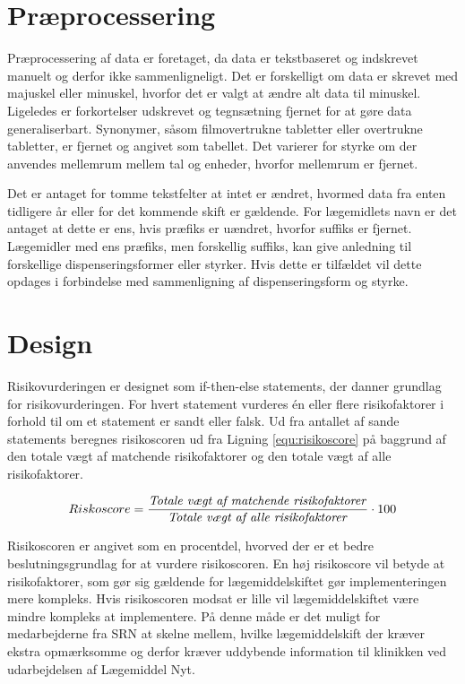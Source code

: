 \section{Præprocessering}
Præprocessering af data er foretaget, da data er tekstbaseret og indskrevet manuelt og derfor ikke sammenligneligt. Det er forskelligt om data er skrevet med majuskel eller minuskel, hvorfor det er valgt at ændre alt data til minuskel. Ligeledes er forkortelser udskrevet og tegnsætning fjernet for at gøre data generaliserbart. 
Synonymer, såsom filmovertrukne tabletter eller overtrukne tabletter, er fjernet og angivet som tabellet. 
Det varierer for styrke om der anvendes mellemrum mellem tal og enheder, hvorfor mellemrum er fjernet. 

Det er antaget for tomme tekstfelter at intet er ændret, hvormed data fra enten tidligere år eller for det kommende skift er gældende. For lægemidlets navn er det antaget at dette er ens, hvis præfiks er uændret, hvorfor suffiks er fjernet. Lægemidler med ens præfiks, men forskellig suffiks, kan give anledning til forskellige dispenseringsformer eller styrker. Hvis dette er tilfældet vil dette opdages i forbindelse med sammenligning af dispenseringsform og styrke. 

\section{Design}
Risikovurderingen er designet som if-then-else statements, der danner grundlag for risikovurderingen. For hvert statement vurderes én eller flere risikofaktorer i forhold til om et statement er sandt eller falsk. Ud fra antallet af sande statements beregnes risikoscoren ud fra Ligning \ref{equ:risikoscore} på baggrund af den totale vægt af matchende risikofaktorer og den totale vægt af alle risikofaktorer.

\begin{equation}  \label{equ:risikoscore}
Riskoscore = \frac{\mbox{\textit{Totale vægt af matchende risikofaktorer}}}{\mbox{\textit{Totale vægt af alle risikofaktorer}}} \cdot 100
\end{equation}

Risikoscoren er angivet som en procentdel, hvorved der er et bedre beslutningsgrundlag for at vurdere risikoscoren. En høj risikoscore vil betyde at risikofaktorer, som gør sig gældende for lægemiddelskiftet gør implementeringen mere kompleks. Hvis risikoscoren modsat er lille vil lægemiddelskiftet være mindre kompleks at implementere. På denne måde er det muligt for medarbejderne fra SRN at skelne mellem, hvilke lægemiddelskift der kræver ekstra opmærksomme og derfor kræver uddybende information til klinikken ved udarbejdelsen af Lægemiddel Nyt.  

